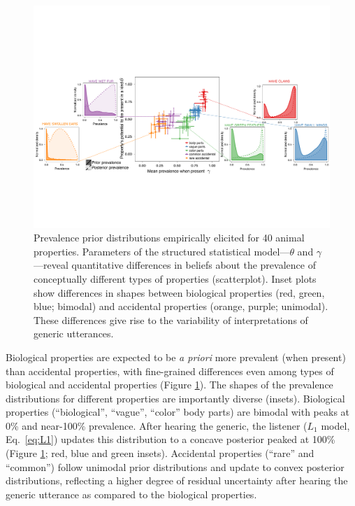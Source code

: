 \documentclass[10pt,letterpaper]{article}
\begin{document}
\begin{figure}
\centering
    \includegraphics[width=\columnwidth]{prevalence-asymmetry-scatterwDists-byItem3.pdf}
    \caption{Prevalence prior distributions empirically elicited for 40 animal properties.
    Parameters of the structured statistical model---$\theta$ and $\gamma$---reveal quantitative differences in beliefs about the prevalence of conceptually different types of properties (scatterplot). 
    Inset plots show differences in shapes between biological properties (red, green, blue; bimodal) and accidental properties (orange, purple; unimodal).   
  These differences give rise to the variability of interpretations of generic utterances. 
  }
  \label{fig:prior2}
\end{figure}


Biological properties are expected to be \emph{a priori} more prevalent (when present) than accidental properties, with fine-grained differences even among types of biological and accidental properties (Figure \ref{fig:prior2}).
The shapes of the prevalence distributions for different properties are importantly diverse (insets). 
Biological properties (``biological'', ``vague'', ``color'' body parts) are bimodal with peaks at 0\% and near-100\% prevalence. 
After hearing the generic, the listener ($L_1$ model, Eq.~\ref{eq:L1}) updates this distribution to a concave posterior peaked at 100\% (Figure \ref{fig:prior2}; red, blue and green insets). 
Accidental properties (``rare'' and ``common'') follow unimodal prior distributions and update to convex posterior distributions, reflecting a higher degree of residual uncertainty after hearing the generic utterance as compared to the biological properties. 
\end{document}
